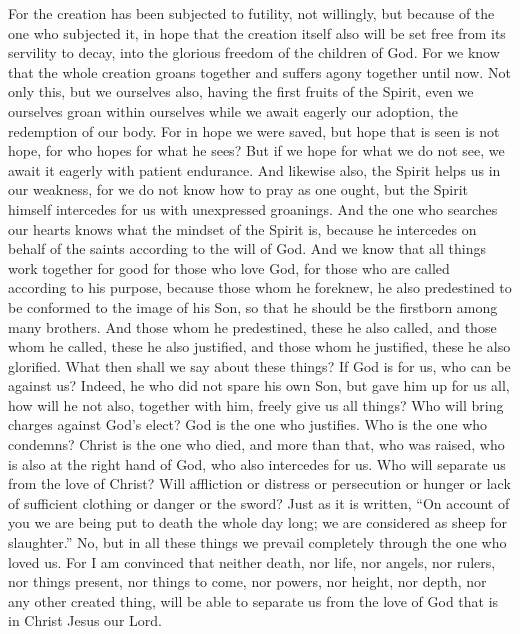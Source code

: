 \begin{biblechapter}
\verse For the creation has been subjected to futility, not willingly, but because of the one who subjected it, in hope
\verse that the creation itself also will be set free from its servility to decay, into the glorious freedom of the children of God.
\verse For we know that the whole creation groans together and suffers agony together until now.
\verse Not only this, but we ourselves also, having the first fruits of the Spirit, even we ourselves groan within ourselves while we await eagerly our adoption, the redemption of our body.
\verse For in hope we were saved, but hope that is seen is not hope, for who hopes for what he sees?
\verse But if we hope for what we do not see, we await it eagerly with patient endurance.
\verse And likewise also, the Spirit helps us in our weakness, for we do not know how to pray as one ought, but the Spirit himself intercedes for us with unexpressed groanings.
\verse And the one who searches our hearts knows what the mindset of the Spirit is, because he intercedes on behalf of the saints according to the will of God.
\verse And we know that all things work together for good for those who love God, for those who are called according to his purpose,
\verse because those whom he foreknew, he also predestined to be conformed to the image of his Son, so that he should be the firstborn among many brothers.
\verse And those whom he predestined, these he also called, and those whom he called, these he also justified, and those whom he justified, these he also glorified.
 What then shall we say about these things? If God is for us, who can be against us?
\verse Indeed, he who did not spare his own Son, but gave him up for us all, how will he not also, together with him, freely give us all things?
\verse Who will bring charges against God’s elect? God is the one who justifies.
\verse Who is the one who condemns? Christ is the one who died, and more than that, who was raised, who is also at the right hand of God, who also intercedes for us.
\verse Who will separate us from the love of Christ? Will affliction or distress or persecution or hunger or lack of sufficient clothing or danger or the sword?
\verse Just as it is written, “On account of you we are being put to death the whole day long; 
we are considered as sheep for slaughter.”
\verse No, but in all these things we prevail completely through the one who loved us.
\verse For I am convinced that neither death, nor life, nor angels, nor rulers, nor things present, nor things to come, nor powers,
\verse nor height, nor depth, nor any other created thing, will be able to separate us from the love of God that is in Christ Jesus our Lord.
\end{biblechapter}


